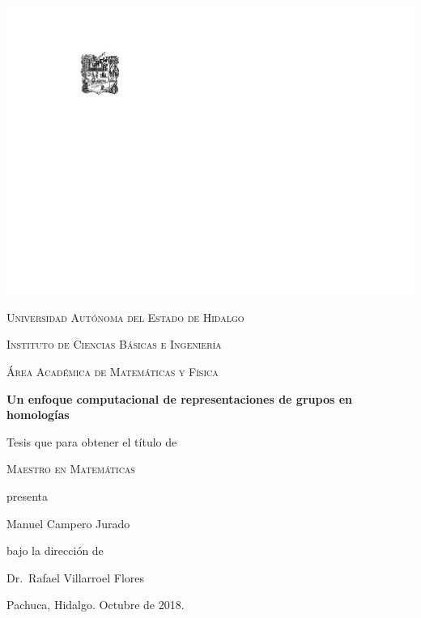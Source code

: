 \documentclass[12pt]{book}
\theoremstyle{definition}
\newcounter{in}
\newcommand{\elespacio}{1.4cm}
\begin{document}
\mainmatter 
\begin{titlepage}
  \begin{center}
    \null
    \vspace*{\fill}

    \includegraphics[scale=1.2,bb=55 20 0 0]{escudouaeh.pdf}

    \vspace*{\elespacio}

    \textsc{Universidad Autónoma del Estado de Hidalgo}

    \textsc{Instituto de Ciencias Básicas e Ingeniería}

    \textsc{Área Académica de Matemáticas y Física}

    \vspace*{\elespacio}

    {\Huge\bfseries Un enfoque computacional de representaciones de
      grupos en homologías\par}

    \vspace*{\elespacio}

    {\large Tesis que para obtener el título de}

    \vspace*{\elespacio}

    {\Large\textsc{Maestro en Matemáticas}}

    \vspace*{\elespacio}

    {\large presenta}

    \vspace*{\elespacio}

    {\Huge Manuel Campero Jurado}

    \vspace*{\elespacio}

    {\large bajo la dirección de}

    \bigskip

    {\Large Dr.~Rafael Villarroel Flores}

    \bigskip

    {Pachuca, Hidalgo. Octubre de 2018.}

    \vspace*{\fill}

  \end{center}
\end{titlepage}
\end{document}
